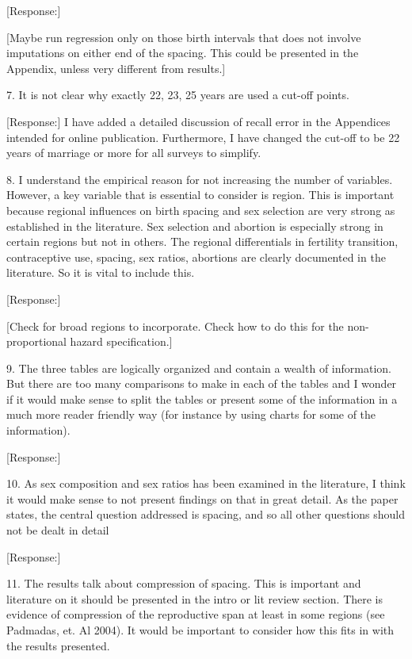 \documentclass[letterpaper,12pt]{article}
\begin{document}
[Response:]

[Maybe run regression only on those birth intervals that does not
involve imputations on either end of the spacing.
This could be presented in the Appendix, unless very different from
results.]

7. It is not clear why exactly 22, 23, 25 years are used a cut-off
points.

[Response:]
I have added a detailed discussion of recall error in the Appendices intended for online 
publication.
Furthermore, I have changed the cut-off to be 22 years of marriage or more for all surveys 
to simplify.


8. I understand the empirical reason for not increasing the number of
variables. However, a key variable that is essential to consider is
region. This is important because regional influences on birth spacing
and sex selection are very strong as established in the literature. Sex
selection and abortion is especially strong in certain regions but not
in others. The regional differentials in fertility transition,
contraceptive use, spacing, sex ratios, abortions are clearly documented
in the literature. So it is vital to include this.

[Response:]

[Check for broad regions to incorporate. Check how to do this for the non-proportional
hazard specification.]

9. The three tables are logically organized and contain a wealth of
information. But there are too many comparisons to make in each of the
tables and I wonder if it would make sense to split the tables or
present some of the information in a much more reader friendly way (for
instance by using charts for some of the information). 

[Response:]

10. As sex composition and sex ratios has been examined in the literature, I think
it would make sense to not present findings on that in great detail. As
the paper states, the central question addressed is spacing, and so all
other questions should not be dealt in detail

[Response:]

11. The results talk about compression of spacing. This is important and
literature on it should be presented in the intro or lit review section.
There is evidence of compression of the reproductive span at least in
some regions (see Padmadas, et. Al 2004). It would be important to
consider how this fits in with the results presented.
\end{document}
